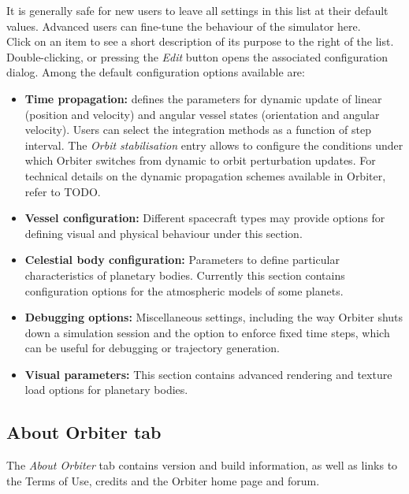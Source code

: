 \documentclass[Orbiter User Manual.tex]{subfiles}
\begin{document}
\begin{figure}[H]
	\centering
\end{figure}

\noindent
It is generally safe for new users to leave all settings in this list at their default values. Advanced users can fine-tune the behaviour of the simulator here.\\
Click on an item to see a short description of its purpose to the right of the list. Double-clicking, or pressing the \textit{Edit} button opens the associated configuration dialog. Among the default configuration options available are:

\begin{itemize}
\item \textbf{Time propagation:} defines the parameters for dynamic update of linear (position and velocity) and angular vessel states (orientation and angular velocity). Users can select the integration methods as a function of step interval. The \textit{Orbit stabilisation} entry allows to configure the conditions under which Orbiter switches from dynamic to orbit perturbation updates. For technical details on the dynamic propagation schemes available in Orbiter, refer to TODO.
\item \textbf{Vessel configuration:} Different spacecraft types may provide options for defining visual and physical behaviour under this section.
\item \textbf{Celestial body configuration:} Parameters to define particular characteristics of planetary bodies. Currently this section contains configuration options for the atmospheric models of some planets.
\item \textbf{Debugging options:} Miscellaneous settings, including the way Orbiter shuts down a simulation session and the option to enforce fixed time steps, which can be useful for debugging or trajectory generation.
\item \textbf{Visual parameters:} This section contains advanced rendering and texture load options for planetary bodies.
\end{itemize}


\subsection{About Orbiter tab}
The \textit{About Orbiter} tab contains version and build information, as well as links to the Terms of Use, credits and the Orbiter home page and forum.

\begin{figure}[H]
	\centering
\end{figure}
\end{document}

